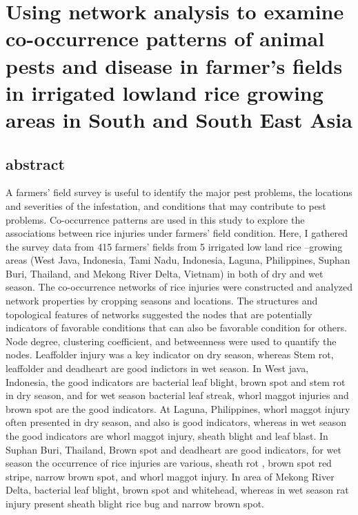 \section{Using network analysis to examine co-occurrence patterns of animal pests and disease in farmer's fields in irrigated lowland rice growing areas in South and South East Asia}


\subsection{abstract}
A farmers’ field survey is useful to identify the major pest problems, the locations and severities of the infestation, and conditions that may contribute to pest problems. Co-occurrence patterns are used in this study to explore the associations between rice injuries under farmers’ field condition. Here, I gathered the survey data from 415 farmers’ fields from 5 irrigated low land rice –growing areas (West Java, Indonesia, Tami Nadu, Indonesia, Laguna, Philippines, Suphan Buri, Thailand, and Mekong River Delta, Vietnam) in both of dry and wet season. The co-occurrence networks of rice injuries were constructed and analyzed network properties by cropping seasons and locations. The structures and topological features of networks suggested the nodes that are potentially indicators of favorable conditions that can also be favorable condition for others. Node degree, clustering coefficient, and betweenness were used to quantify the nodes. Leaffolder injury was a key indicator on dry season, whereas Stem rot, leaffolder and deadheart are good indictors in wet season. In West java, Indonesia, the good indicators are bacterial leaf blight, brown spot and stem rot in dry season, and for wet season bacterial leaf streak, whorl maggot injuries and brown spot are the good indicators. At Laguna, Philippines, whorl maggot injury often presented in dry season, and also is good indicators, whereas in wet season the good indicators are whorl maggot injury, sheath blight and leaf blast. In Suphan Buri, Thailand, Brown spot and deadheart are good indicators, for wet season the occurrence of rice injuries are various, sheath rot , brown spot red stripe, narrow brown spot, and whorl maggot injury. In area of Mekong River Delta, bacterial leaf blight, brown spot and whitehead, whereas in wet season rat injury present sheath blight rice bug and narrow brown spot.

